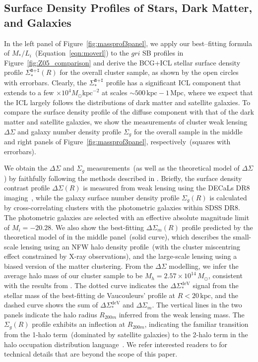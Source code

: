 \documentclass[fleqn,usenatbib]{mnras}
\newcommand{\sigbi}{\Sigma_*^{\texttt{B+I}}}
\newcommand{\sigg}{\Sigma_g}
\newcommand{\mh}{M_h}
\newcommand{\mpc}{\mathrm{Mpc}}
\newcommand{\kpc}{\mathrm{kpc}}
\newcommand{\msol}{M_{\odot}}
\newcommand{\ds}{\Delta\Sigma}
\begin{document}
\subsection{Surface Density Profiles of Stars, Dark Matter, and Galaxies}
\label{subsec:sigmathree}

In the left panel of Figure~\ref{fig:massprof3panel}, we apply our
best--fitting formula of $M_*/L_i$~(Equation~\ref{eqn:moverl}) to the $gri$
SB profiles in Figure~\ref{fig:Z05_comparison} and derive the BCG+ICL
stellar surface density profile $\sigbi(R)$ for the overall cluster sample,
as shown by the open circles with errorbars. Clearly, the $\sigbi$ profile
has a significant ICL component that extends to a few ${\times}10^4
\msol\kpc^{-2}$ at scales ${\sim}500\,\kpc{-}1\,\mpc$, where we expect that
the ICL largely follows the distributions of dark matter and satellite
galaxies. To compare the surface density profile of the diffuse component
with that of the dark matter and satellite galaxies, we show the
measurements of cluster weak lensing $\ds$ and galaxy number density
profile $\sigg$ for the overall sample in the middle and right panels of
Figure~\ref{fig:massprof3panel}, respectively~(squares with errorbars).


We obtain the $\ds$ and $\sigg$ measurements~(as well as the theoretical
model of $\ds$) by faithfully following the methods described in
.  Briefly, the surface density contrast profile
$\ds(R)$ is measured from weak lensing using the DECaLs DR8
imaging~\citep{Dey2019}, while the galaxy surface number density profile
$\sigg(R)$ is calculated by cross-correlating clusters with the photometric
galaxies within SDSS DR8. The photometric galaxies are selected with an
effective absolute magnitude limit of $M_i{=}-20.28$. We also show the
best-fitting $\ds_m(R)$ profile predicted by the theoretical model of
 in the middle panel~(solid curve), which describes the
small-scale lensing using an NFW halo density profile~(with the cluster
miscentring effect constrained by X-ray observations), and the large-scale
lensing using a biased version of the matter clustering. From the $\ds$
modelling, we infer the average halo mass of our cluster sample to be
$\mh{=}2.57{\times}10^{14}\,\msol$, consistent with the results from
. The dotted curve indicates the $\ds_*^{\mathrm{deV}}$
signal from the stellar mass of the best-fitting de Vaucouleurs' profile at
$R{<}20\,\kpc$, and the dashed curve shows the sum of
$\ds_*^{\mathrm{deV}}$ and $\ds_m$. The vertical lines in the two panels
indicate the halo radius $R_{200m}$ inferred from the weak lensing mass.
The $\sigg(R)$ profile exhibits an inflection at $R_{200m}$, indicating the
familiar transition from the 1-halo term~(dominated by satellite galaxies)
to the 2-halo term in the halo occupation distribution
language~\citep[e.g.,][]{Zu2015}.  We refer interested readers to
 for technical details that are beyond the scope of this
paper.
\end{document}
